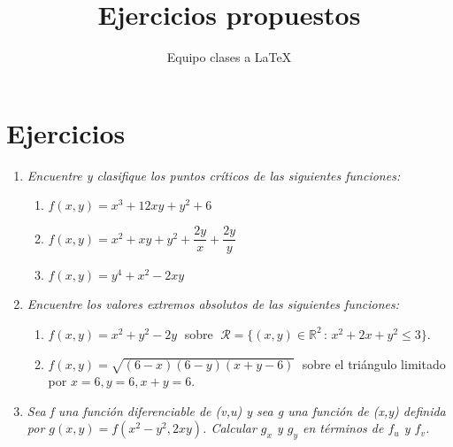 \documentclass[12pt]{article}
\title{Ejercicios propuestos}
\author{Equipo clases a \LaTeX}
\newcommand{\ejercicios}{\section{Ejercicios}}
\newcommand{\Rn}[1]{\mathbb{R}^{#1}}
\begin{document}
\maketitle

\ejercicios
    \begin{enumerate}
        \item \textit{Encuentre y clasifique los puntos críticos de las siguientes funciones:}
        
        \begin{enumerate}
            \item $f(x,y) = x^{3} + 12xy + y^{2} + 6$
            
            \item $f(x,y) = x^{2} + xy + y^{2} + \dfrac{2y}{x} + \dfrac{2y}{y}$
            
            \item $f(x,y) = y^{4} + x^{2} - 2xy$
            
        \end{enumerate}
        
        \item \textit{Encuentre los valores extremos absolutos de las siguientes funciones:}
        
        \begin{enumerate}
            \item $f(x,y) = x^{2} + y^{2} - 2y \;$ sobre  $\; \mathscr{R} = \{(x,y) \in \Rn{2} \, : \, x^{2} + 2x + y^{2} \leqslant 3 \}$.\\
            
            \item $f(x,y) = \sqrt{(6-x)(6-y)(x+y - 6)} \;$ sobre el triángulo limitado por \linebreak $x = 6, y = 6, x + y = 6$.
        \end{enumerate}
        
        \item \textit{Sea f una función diferenciable de (v,u) y sea g una función de (x,y) definida por $g(x,y) = f(x^{2} - y^{2}, 2xy)$. Calcular $g_x$ y $g_y$ en términos de $f_u$ y $f_v$.}
        
        
    \end{enumerate}
\end{document}
